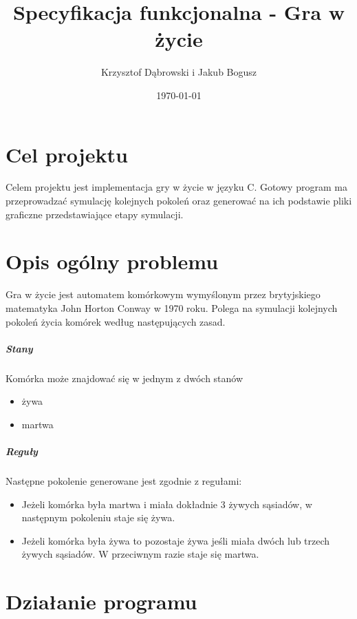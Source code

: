 \documentclass{report}
\title{Specyfikacja funkcjonalna - Gra w życie}
\author{Krzysztof Dąbrowski i Jakub Bogusz}
\date{\today}
\begin{document}
\maketitle{}

\tableofcontents{}

\chapter{Cel projektu}
Celem projektu jest implementacja gry w życie w języku C. Gotowy program ma przeprowadzać symulację kolejnych pokoleń oraz generować na ich podstawie pliki graficzne przedstawiające etapy symulacji.

\chapter{Opis ogólny problemu}
Gra w życie jest automatem komórkowym wymyślonym przez brytyjskiego matematyka John Horton Conway %
w 1970 roku. Polega na symulacji kolejnych pokoleń życia komórek według następujących zasad.


\paragraph{Stany}  Komórka może znajdować się w jednym z dwóch stanów
\begin{itemize}
\item żywa
\item martwa
\end{itemize}

\paragraph{Reguły} Następne pokolenie generowane jest zgodnie z regułami:
\begin{itemize}
\item Jeżeli komórka była martwa i miała dokładnie 3 żywych sąsiadów, w następnym pokoleniu staje się żywa.
\item Jeżeli komórka była żywa to pozostaje żywa jeśli miała dwóch lub trzech żywych sąsiadów. W przeciwnym razie staje się martwa.
\end{itemize}

\chapter{Działanie programu}
\end{document}
